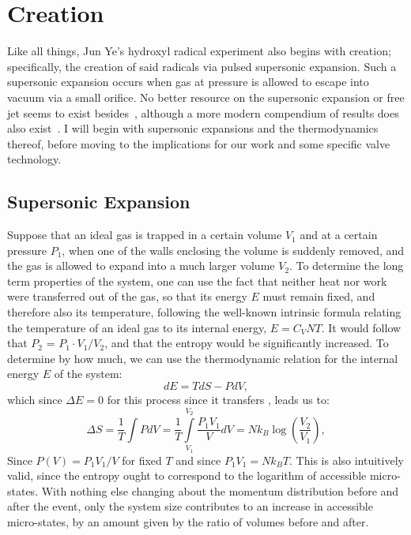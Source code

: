 \ifx\justbeingincluded\undefined


\fi

\chapter{Creation}

Like all things, Jun Ye's hydroxyl radical experiment also begins with creation; specifically, the creation of said radicals via pulsed supersonic expansion. 
Such a supersonic expansion occurs when gas at pressure is allowed to escape into vacuum via a small orifice.
No better resource on the supersonic expansion or free jet seems to exist besides~\cite{Miller1988}, although a more modern compendium of results does also exist~\cite{Campargue2000}.
I will begin with supersonic expansions and the thermodynamics thereof, before moving to the implications for our work and some specific valve technology.

\section{Supersonic Expansion}\label{secsuperexp}

Suppose that an ideal gas is trapped in a certain volume $V_1$ and at a certain pressure $P_1$, when one of the walls enclosing the volume is suddenly removed, and the gas is allowed to expand into a much larger volume $V_2$.
To determine the long term properties of the system, one can use the fact that neither heat nor work were transferred out of the gas, so that its energy $E$ must remain fixed, and therefore also its temperature, following the well-known intrinsic formula relating the temperature of an ideal gas to its internal energy, $E = C_VNT$.
It would follow that $P_2$ = $P_1\cdot V_1/V_2$, and that the entropy would be significantly increased.
To determine by how much, we can use the thermodynamic relation for the internal energy $E$ of the system:
\begin{equation}
dE = TdS - PdV,
\end{equation}
which since $\Delta E=0$ for this process since it transfers , leads us to:
\begin{equation}
\Delta S = \frac{1}{T}\int PdV = \frac{1}{T}\int\limits_{V_1}^{V_2}\frac{P_1V_1}{V}dV = Nk_B\log{\left(\frac{V_2}{V_1}\right)},
\end{equation}
Since $P(V) = P_1V_1/V$ for fixed $T$ and since $P_1V_1 = Nk_BT$.
This is also intuitively valid, since the entropy ought to correspond to the logarithm of accessible micro-states.
With nothing else changing about the momentum distribution before and after the event, only the system size contributes to an increase in accessible micro-states, by an amount given by the ratio of volumes before and after.

